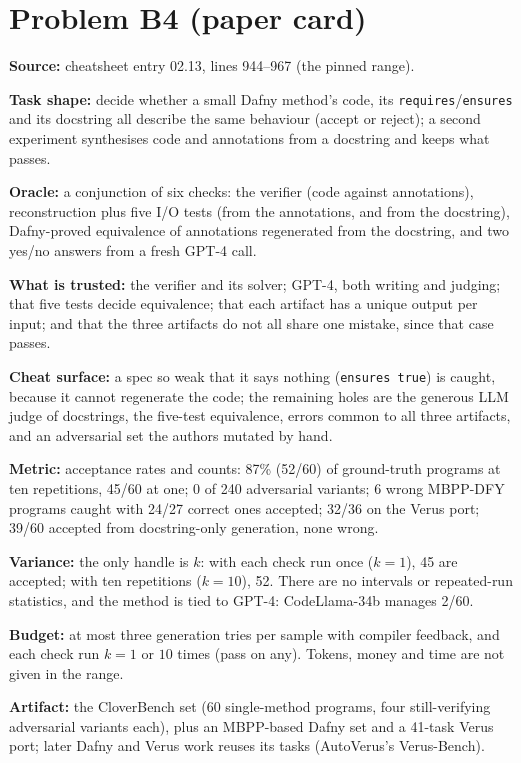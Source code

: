 \documentclass[11pt]{article}
\begin{document}
\section*{Problem B4 (paper card)}\label{ans:B4}
\begin{answer}
\textbf{Source:} cheatsheet entry 02.13, lines 944--967 (the pinned range).

\textbf{Task shape:} decide whether a small Dafny method's code, its
\texttt{requires}/\texttt{ensures} and its docstring all describe the same
behaviour (accept or reject); a second experiment synthesises code and
annotations from a docstring and keeps what passes.

\textbf{Oracle:} a conjunction of six checks: the verifier (code against
annotations), reconstruction plus five I/O tests (from the annotations, and
from the docstring), Dafny-proved equivalence of annotations regenerated from
the docstring, and two yes/no answers from a fresh GPT-4 call.

\textbf{What is trusted:} the verifier and its solver; GPT-4, both writing and
judging; that five tests decide equivalence; that each artifact has a unique
output per input; and that the three artifacts do not all share one mistake,
since that case passes.

\textbf{Cheat surface:} a spec so weak that it says nothing (\texttt{ensures
true}) is caught, because it cannot regenerate the code; the remaining holes
are the generous LLM judge of docstrings, the five-test equivalence, errors
common to all three artifacts, and an adversarial set the authors mutated by
hand.

\textbf{Metric:} acceptance rates and counts: 87\% (52/60) of ground-truth
programs at ten repetitions, 45/60 at one; 0 of 240 adversarial variants; 6
wrong MBPP-DFY programs caught with 24/27 correct ones accepted; 32/36 on the
Verus port; 39/60 accepted from docstring-only generation, none wrong.

\textbf{Variance:} the only handle is $k$: with each check run once ($k = 1$),
45 are accepted; with ten repetitions ($k = 10$), 52.
There are no intervals or repeated-run statistics, and the method is tied to
GPT-4: CodeLlama-34b manages 2/60.

\textbf{Budget:} at most three generation tries per sample with compiler
feedback, and each check run $k = 1$ or $10$ times (pass on any). Tokens,
money and time are not given in the range.

\textbf{Artifact:} the CloverBench set (60 single-method programs, four
still-verifying adversarial variants each), plus an MBPP-based Dafny set and a
41-task Verus port; later Dafny and Verus work reuses its tasks (AutoVerus's
Verus-Bench).
\end{answer}
\end{document}
